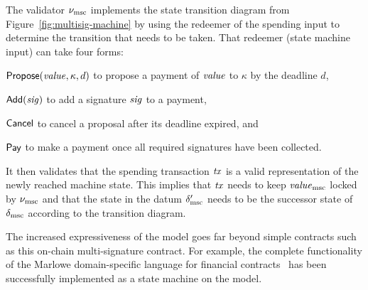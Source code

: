 The validator $\nu_{\mathrm{msc}}$ implements the state transition diagram from
Figure~\ref{fig:multisig-machine} by using the redeemer of the spending input to determine the transition that needs to be taken. That redeemer (state machine input) can take four forms: 
\begin{inparaenum}[(1)]
\item \(\mathsf{Propose}(\mathit{value}, \kappa, d)\) to propose a payment of $\mathit{value}$ to $\kappa$
  by the deadline $d$, 
\item \(\mathsf{Add}(\mathit{sig})\) to add a signature $\mathit{sig}$ to a payment, 
\item $\mathsf{Cancel}$ to cancel a proposal after its deadline expired, and 
\item $\mathsf{Pay}$ to make a payment once all required signatures have been collected. 
\end{inparaenum}
It then validates that the spending transaction $\mathit{tx}$ is a valid
representation of the newly reached machine state. This implies that
$\mathit{tx}$ needs to keep $\mathit{value}_{\mathrm{msc}}$ locked by $\nu_{\mathrm{msc}}$ and that the
state in the datum $\delta^{\prime}_{\mathrm{msc}}$ needs to be the successor state
of $\delta_{\mathrm{msc}}$ according to the transition diagram.

The increased expressiveness of the \EUTXO{} model goes far beyond
simple contracts such as this on-chain multi-signature contract. For
example, the complete functionality of the Marlowe domain-specific
language for financial contracts~\cite{marlowe} has been successfully
implemented as a state machine on the \EUTXO{} model.
